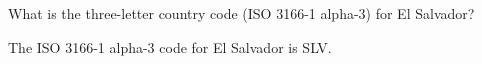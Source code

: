 
\begin{question}
What is the three-letter country code (ISO 3166-1 alpha-3) for
El Salvador?
\end{question}

\begin{solution}
The ISO 3166-1 alpha-3 code for El Salvador is SLV.
\end{solution}

